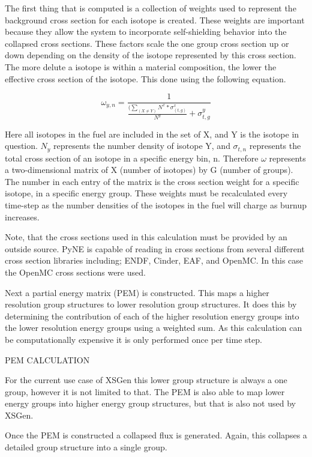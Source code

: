 \documentclass{article}
\begin{document}
The first thing that is computed is a collection of weights used to represent the background cross section for each isotope is created. These weights are important because they allow the system to incorporate self-shielding behavior into the collapsed cross sections. These factors scale the one group cross section up or down depending on the density of the isotope represented by this cross section. The more delute a isotope is within a material composition, the lower the effective cross section of the isotope. This done using the following equation.

$$\omega_{y,n}=\frac{1}{\frac{(\sum_(X\neq Y)N^x * σ_(t,g)^x}{N^y}+\sigma_{t,g}^y}$$

Here all isotopes in the fuel are included in the set of X, and Y is the isotope in question. $N_y$ represents the number density of isotope Y, and $\sigma_{t,n}$ represents the total cross section of an isotope in a specific energy bin, n. Therefore $\omega$ represents a two-dimensional matrix of X (number of isotopes) by G (number of groups). The number in each entry of the matrix is the cross section weight for a specific isotope, in a specific energy group. These weights must be recalculated every time-step as the number densities of the isotopes in the fuel will charge as burnup increases. 

Note, that the cross sections used in this calculation must be provided by an outside source. PyNE is capable of reading in cross sections from several different cross section libraries including; ENDF, Cinder, EAF, and OpenMC. In this case the OpenMC cross sections were used. 

Next a partial energy matrix (PEM) is constructed. This maps a higher resolution group structures to lower resolution group structures. It does this by determining the contribution of each of the higher resolution energy groups into the lower resolution energy groups using a weighted sum. As this calculation can be computationally expensive it is only performed once per time step. 

PEM CALCULATION

For the current use case of XSGen this lower group structure is always a one group, however it is not limited to that. The PEM is also able to map lower energy groups into higher energy group structures, but that is also not used by XSGen.  

Once the PEM is constructed a collapsed flux is generated. Again, this collapses a detailed group structure into a single group. 
\end{document}
